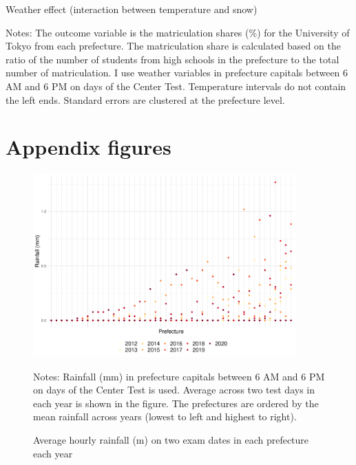 \documentclass[12pt,letterpaper]{article}
\begin{document}
\begin{table}[!htbp]
  \centering
  \caption{Weather effect (interaction between temperature and snow)}
  \resizebox{0.6\linewidth}{!}{
  
  }
  \label{tab:hetero_exam_reg}
  \footnotesize
  \begin{tablenotes}
    \item 
      Notes:
      The outcome variable is the matriculation shares (\%) for the University of Tokyo from each prefecture.
      The matriculation share is calculated based on the ratio of the number of students from high schools in the prefecture to the total number of matriculation.
      I use weather variables in prefecture capitals between 6 AM and 6 PM on days of the Center Test.
      Temperature intervals do not contain the left ends.
      Standard errors are clustered at the prefecture level.
  \end{tablenotes}
\end{table}


\setcounter{figure}{0}
\setcounter{table}{0}
\renewcommand\thefigure{\Alph{section}.\arabic{figure}}
\renewcommand\thetable{\Alph{section}.\arabic{table}}
  
\section{Appendix figures}\label{sec:appendix_figure}

\begin{figure}[H]
  \centering
  \caption{Average hourly rainfall (m) on two exam dates in each prefecture each year}
  \includegraphics[width = 0.9\textwidth]{../Output/images/rainfall_diff.pdf}
  \label{fig:rainfall_diff}
  \footnotesize
  \begin{tablenotes}
    \item Notes:
      Rainfall (mm) in prefecture capitals between 6 AM and 6 PM on days of the Center Test is used.
      Average across two test days in each year is shown in the figure.
      The prefectures are ordered by the mean rainfall across years (lowest to left and highest to right).
  \end{tablenotes}
\end{figure}
\end{document}
